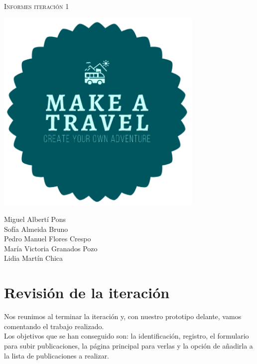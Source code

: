 \documentclass[11pt]{article}
\begin{document}
\begin{titlepage}
\centering
\vspace{4.5cm}
{\scshape\LARGE Informes iteración 1\par}
\vspace{1.5cm}

\includegraphics[width=10cm] {Logo}

\vspace{3cm}
{\scshape\large \par}
\vspace{1cm}

{Miguel Albertí Pons\\
Sofía Almeida Bruno\\
Pedro Manuel Flores Crespo\\
María Victoria Granados Pozo\\
Lidia Martín Chica
\par}

\end{titlepage}

\newpage

\section*{Revisión de la iteración}
Nos reunimos al terminar la iteración y, con nuestro prototipo delante, vamos comentando el trabajo realizado.\\

Los objetivos que se han conseguido son: la identificación, registro, el formulario para subir publicaciones, la página principal para verlas y la opción de añadirla a la lista de publicaciones a realizar.\\
\end{document}
